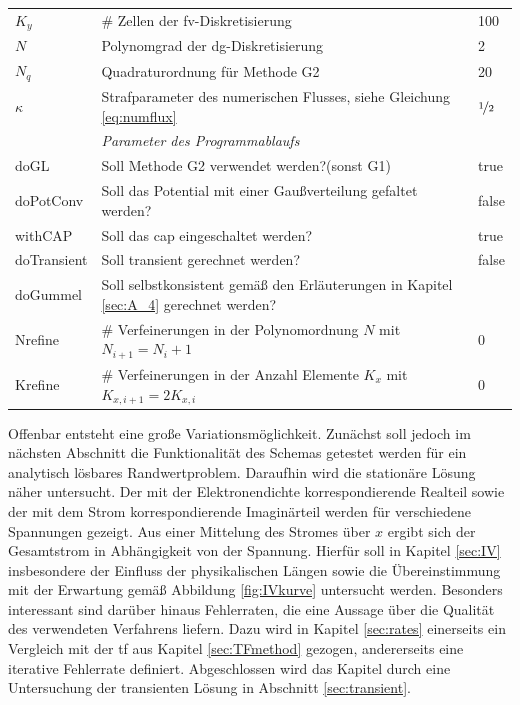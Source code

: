 \begin{table}
\begin{tabular}{
    l
    l
    l
  }
    $K_y$ & \# Zellen der \ac{fv}-Diskretisierung & 100 \\
    $N$ & Polynomgrad der \ac{dg}-Diskretisierung & 2 \\
    $N_q$ & Quadraturordnung für Methode G2 & 20 \\
    $\kappa$ & Strafparameter des numerischen Flusses, siehe Gleichung \eqref{eq:numflux} &$\nicefrac{1}{2}$ \\
    \midrule
     & \emph{Parameter des Programmablaufs} & \\
    doGL & Soll Methode G2 verwendet werden?(sonst G1) & true \\
    doPotConv & Soll das Potential mit einer Gaußverteilung gefaltet werden? & false\\
    withCAP & Soll das \ac{cap} eingeschaltet werden? & true \\
    doTransient & Soll transient gerechnet werden? & false \\
    doGummel & Soll selbstkonsistent gemäß den Erläuterungen in Kapitel \ref{sec:A_4} gerechnet werden? \\
    Nrefine  & \# Verfeinerungen in der Polynomordnung $N$ mit $N_{i+1}=N_i+1$ & 0 \\
    Krefine  & \# Verfeinerungen in der Anzahl Elemente $K_x$ mit $K_{x,i+1}=2K_{x,i}$ & 0 \\
    \bottomrule
  \end{tabular}
\end{table}
Offenbar entsteht eine große Variationsmöglichkeit. Zunächst soll jedoch im nächsten Abschnitt die Funktionalität des Schemas getestet werden für ein analytisch lösbares Randwertproblem. Daraufhin wird die stationäre Lösung näher untersucht. Der mit der Elektronendichte korrespondierende Realteil sowie der mit dem Strom korrespondierende Imaginärteil werden für verschiedene Spannungen gezeigt. Aus einer Mittelung des Stromes über $x$ ergibt sich der Gesamtstrom in Abhängigkeit von der Spannung. Hierfür soll in Kapitel \ref{sec:IV} insbesondere der Einfluss der physikalischen Längen sowie die Übereinstimmung mit der Erwartung gemäß Abbildung \ref{fig:IVkurve} untersucht werden. Besonders interessant sind darüber hinaus Fehlerraten, die eine Aussage über die Qualität des verwendeten Verfahrens liefern. Dazu wird in Kapitel \ref{sec:rates} einerseits ein Vergleich mit der \ac{tf} aus Kapitel \ref{sec:TFmethod} gezogen, andererseits eine iterative Fehlerrate definiert. Abgeschlossen wird das Kapitel durch eine Untersuchung der transienten Lösung in Abschnitt \ref{sec:transient}.

